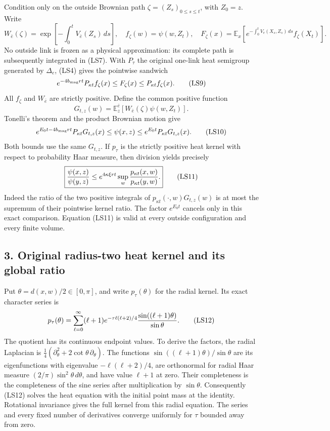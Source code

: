 \documentclass[11pt]{article}
\begin{document}
Condition only on the outside Brownian path
\(\zeta=(Z_s)_{0\le s\le t}\), with \(Z_0=z\).
Write
\[
 W_{\bar e}(\zeta)=\exp\!\left[-\int_0^tV_{\bar e}(Z_s)\,ds\right],
 \quad f_\zeta(w)=\psi(w,Z_t),\quad
 F_\zeta(x)=\mathbb E_x\!\left[
  e^{-\int_0^tV_e(X_s,Z_s)\,ds}f_\zeta(X_t)\right].
 \tag{LS8}
\]
No outside link is frozen as a physical approximation: its complete
path is subsequently integrated in (LS7). With \(P_\tau\) the
original one-link heat semigroup generated by \(\Delta_e\),
(LS4) gives the pointwise sandwich
\[
 e^{-4b_{\rm mag}rt}P_{\kappa t}f_\zeta(x)
       \le F_\zeta(x)\le P_{\kappa t}f_\zeta(x).
 \tag{LS9}
\]
All \(f_\zeta\) and \(W_{\bar e}\) are strictly positive.
Define the common positive function
\[
 G_{t,z}(w)=\mathbb E_z^{\bar e}
                    [W_{\bar e}(\zeta)\psi(w,Z_t)].
 \]
Tonelli's theorem and the product Brownian motion give
\[
 e^{E_0t-4b_{\rm mag}rt}P_{\kappa t}G_{t,z}(x)
    \le\psi(x,z)\le e^{E_0t}P_{\kappa t}G_{t,z}(x).
 \tag{LS10}
\]
Both bounds use the same \(G_{t,z}\). If \(p_\tau\) is the
strictly positive heat kernel with respect to probability Haar
measure, then division yields precisely
\[
 \boxed{{\psi(x,z)\over\psi(y,z)}
 \le e^{4\kappa\xi rt}
      \sup_w{p_{\kappa t}(x,w)\over p_{\kappa t}(y,w)}.}
 \tag{LS11}
\]
Indeed the ratio of the two positive integrals of
\(p_{\kappa t}(\cdot,w)G_{t,z}(w)\) is at most the supremum
of their pointwise kernel ratio. The factor \(e^{E_0t}\) cancels
only in this exact comparison. Equation (LS11) is valid at every
outside configuration and every finite volume.

\subsection*{3. Original radius-two heat kernel and its global ratio}

Put \(\theta=d(x,w)/2\in[0,\pi]\), and write \(p_\tau(\theta)\)
for the radial kernel. Its exact character series is
\[
 p_\tau(\theta)=\sum_{\ell=0}^{\infty}
   (\ell+1)e^{-\tau\ell(\ell+2)/4}
                      {\sin((\ell+1)\theta)\over\sin\theta}.
 \tag{LS12}
\]
The quotient has its continuous endpoint values. To derive the
factors, the radial Laplacian is
\(\tfrac14(\partial_\theta^2+2\cot\theta\,\partial_\theta)\).
The functions
\(\sin((\ell+1)\theta)/\sin\theta\) are its eigenfunctions with
eigenvalue \(-\ell(\ell+2)/4\), are orthonormal for radial Haar
measure \((2/\pi)\sin^2\theta\,d\theta\), and have value
\(\ell+1\) at zero. Their completeness is the completeness of
the sine series after multiplication by \(\sin\theta\).
Consequently (LS12) solves the heat equation with the initial
point mass at the identity. Rotational invariance gives the full
kernel from this radial equation. The series and every fixed
number of derivatives converge uniformly for \(\tau\) bounded
away from zero.
\end{document}
